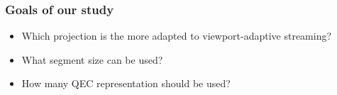 \begin{frame}[c]
\end{frame}

\begin{frame}[c]
   \frametitle{Goals of our study}

   \vfill
   \begin{itemize}[<+->]
      \item Which projection is the more adapted to viewport-adaptive streaming?
      \vfill
      \item What segment size can be used?
      \vfill
      \item How many QEC representation should be used?
   \end{itemize}
   \vfill

\end{frame}
